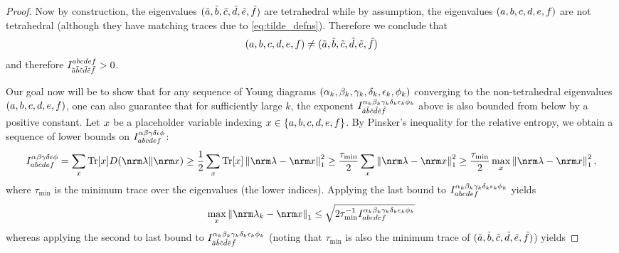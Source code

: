 \documentclass[notitlepage, 10pt]{article}
\begin{document}
\begin{proof}
    Now by construction, the eigenvalues $(\tilde {a}, \tilde {b}, \tilde {c}, \tilde {d}, \tilde {e}, \tilde {f})$ are tetrahedral while by assumption, the eigenvalues $(a, b, c, d, e, f)$ are not tetrahedral (although they have matching traces due to \cref{eq:tilde_defns}).
    Therefore we conclude that
    \begin{equation}
        (a, b, c, d, e, f) \neq (\tilde {a}, \tilde {b}, \tilde {c}, \tilde {d}, \tilde {e}, \tilde {f})
    \end{equation}
    and therefore $I_{\tilde {a}\tilde {b}\tilde {c}\tilde {d}\tilde {e}\tilde {f}}^{abcdef} > 0$.

    Our goal now will be to show that for any sequence of Young diagrams $(\alpha_k, \beta_k, \gamma_k, \delta_k, \epsilon_k, \phi_k)$ converging to the non-tetrahedral eigenvalues $(a,b,c,d,e,f)$, one can also guarantee that for sufficiently large $k$, the exponent $I_{\tilde {a}\tilde {b}\tilde {c}\tilde {d}\tilde {e}\tilde {f}}^{\alpha_k\beta_k\gamma_k\delta_k\epsilon_k\phi_k}$ above is also bounded from below by a positive constant.
    Let $x$ be a placeholder variable indexing $x \in \{a,b,c,d,e,f\}$.
    By Pinsker's inequality for the relative entropy, we obtain a sequence of lower bounds on $I^{\alpha\beta\gamma\delta\epsilon\phi}_{abcdef}$:
    \begin{align}
        I^{\ya\yb\yc\yd\ye\yf}_{\ea\eb\ec\ed\ee\ef}
        = \sum_{\ex} {\tex} \kl{\nrm \yx}{\nrm \ex}
        \geq \frac{1}{2}\sum_{\ex} {\tex} \norm{\nrm \yx - \nrm \ex}_{1}^{2}
        \geq \frac{\tau_{\min}}{2} \sum_{\ex} \norm{\nrm \yx - \nrm \ex}_{1}^{2}
        \geq \frac{\tau_{\min}}{2} \max_{\ex} \norm{\nrm \yx - \nrm \ex}_{1}^{2},
    \end{align}
    where $\tau_{\min}$ is the minimum trace over the eigenvalues (the lower indices).
    Applying the last bound to $I_{abcdef}^{\alpha_k\beta_k\gamma_k\delta_k\epsilon_k\phi_k}$ yields
    \begin{equation}
        \max_{\ex}\norm{\nrm \yx_k - \nrm \ex}_{1} \leq \sqrt{2 \tau_{\min}^{-1} I_{\ea\eb\ec\ed\ee\ef}^{\ya_k\yb_k\yc_k\yd_k\ye_k\yf_k}}
    \end{equation}
    whereas applying the second to last bound to $I_{\tilde {a}\tilde {b} \tilde {c}\tilde {d}\tilde {e}\tilde {f}}^{\alpha_k\beta_k\gamma_k\delta_k\epsilon_k\phi_k}$ (noting that $\tau_{\min}$ is also the minimum trace of $(\tilde {a},\tilde {b}, \tilde {c}, \tilde {d}, \tilde {e}, \tilde {f})$) yields

\end{proof}
\end{document}
